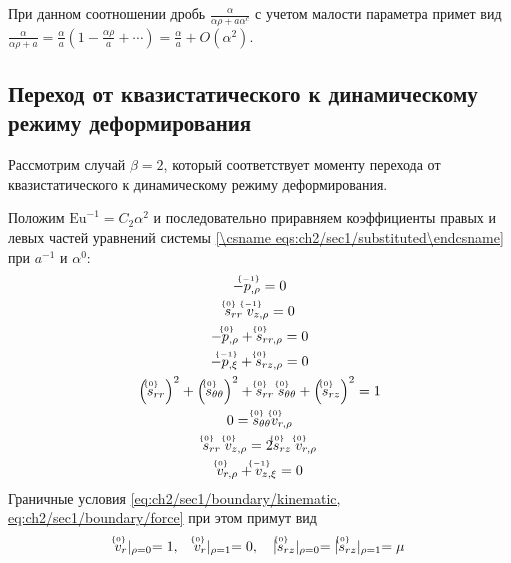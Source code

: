 При данном соотношении дробь $\frac{\alpha}{\alpha\rho+a \alpha^c}$ с учетом малости параметра примет вид $\frac{\alpha}{\alpha\rho+a} = \frac{\alpha}{a}\left(1-\frac{\alpha\rho}{a}+\cdots\right) = \frac{\alpha}{a} + O\left(\alpha^2\right)$.

\subsection{Переход от квазистатического к динамическому режиму деформирования}\label{subsec:ch2/sec4/sub1}

Рассмотрим случай $\beta=2$, который соответствует моменту перехода от квазистатического к динамическому режиму деформирования.

Положим $\text{Eu}^{-1} = C_2 \alpha^2$ и последовательно приравняем коэффициенты правых и левых частей уравнений системы \cref{\csname eqs:ch2/sec1/substituted\endcsname} при $a^{-1}$ и $\alpha^0$:
\begingroup
\allowdisplaybreaks
\label{eqs:ch2/sec4/sub1/main}
\begin{gather}
  \label{eqs:ch2/sec4/sub1/-1/motion:2}
  -\uindex{p}{-1}_{,\rho} = 0
  \\
  \label{eqs:ch2/sec4/sub1/-1/coax:2}
  \uindex{s}{0}_{rr} \; \uindex{v}{-1}_{z,\rho} = 0
  \\
  \label{eqs:ch2/sec4/sub1/0/motion:1}
  -\uindex{p}{0}_{,\rho}+\uindex{s}{0}_{rr,\rho} = 0
  \\
  \label{eqs:ch2/sec4/sub1/0/motion:2}
  -\uindex{p}{-1}_{,\xi} + \uindex{s}{0}_{rz,\rho} = 0
  \\
  \label{eqs:ch2/sec4/sub1/0/plasticity}
  \left(\uindex{s}{0}_{rr}\right)^2 + \left(\uindex{s}{0}_{\theta\theta}\right)^2 + \uindex{s}{0}_{rr}\; \uindex{s}{0}_{\theta\theta} + \left(\uindex{s}{0}_{rz}\right)^2 = 1
  \\
  \label{eqs:ch2/sec4/sub1/0/coax:1}
  0 = \uindex{s}{0}_{\theta\theta} \uindex{v}{0}_{r,\rho}
  \\
  \label{eqs:ch2/sec4/sub1/0/coax:2}
  \uindex{s}{0}_{rr} \; \uindex{v}{0}_{z,\rho} = 2 \uindex{s}{0}_{rz} \; \uindex{v}{0}_{r,\rho}
  \\
  \label{eqs:ch2/sec4/sub1/0/uncompress}
  \uindex{v}{0}_{r,\rho} + \uindex{v}{-1}_{z,\xi} = 0
\end{gather}
\endgroup
Граничные условия \cref{eq:ch2/sec1/boundary/kinematic, eq:ch2/sec1/boundary/force} при этом примут вид
\begin{equation}
  \label{eq:ch2/sec4/sub1/boundary/0}
  \uindex{v}{0}_{r}\lvert_{\rho=0} = 1,\quad \uindex{v}{0}_{r}\lvert_{\rho=1} = 0, \quad \lvert \uindex{s}{0}_{rz}\lvert_{\rho=0} = \lvert \uindex{s}{0}_{rz}\lvert_{\rho=1} = \mu
\end{equation}
